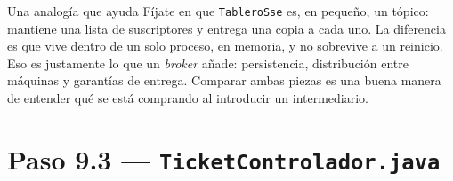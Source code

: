 \documentclass[11pt,a4paper]{book}
\newcommand{\clase}[1]{\texttt{#1}}
\begin{document}
\begin{cajaNota}{Una analogía que ayuda}
	Fíjate en que \clase{TableroSse} es, en pequeño, un tópico: mantiene una lista de suscriptores y entrega una copia a cada uno.
	La diferencia es que vive dentro de un solo proceso, en memoria, y no sobrevive a un reinicio.
	Eso es justamente lo que un \emph{broker} añade: persistencia, distribución entre máquinas y garantías de entrega.
	Comparar ambas piezas es una buena manera de entender qué se está comprando al introducir un intermediario.
\end{cajaNota}

\section{Paso 9.3 --- \texttt{TicketControlador.java}}
\end{document}

